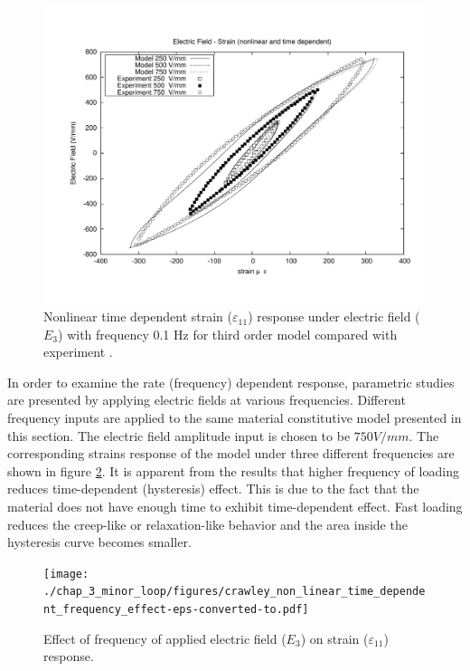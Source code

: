 \begin{figure}
\centering
\includegraphics[width=5.0in]
{./chap_3_minor_loop/figures/crawley_non_linear_time_independent_third_order.pdf}
\caption{Nonlinear time dependent strain ($\varepsilon_{11}$) response under electric field ($E_3$) with frequency 0.1 Hz for third order model compared with experiment \cite{Crawley1990}.}
\label{fig:TimeDepenNonLinCrawleyThirdordermodel}
\end{figure}
 
In order to examine the rate (frequency) dependent response, parametric studies are presented by applying electric fields at various frequencies. 
Different frequency inputs are applied to the same material constitutive model presented in this section. The electric field amplitude input is chosen to be $750 V/mm$.
The corresponding strains response of the model under three different frequencies are shown in figure \ref{fig:Frequency_Effect}. 
It is apparent from the results that higher frequency of loading reduces time-dependent (hysteresis) effect. 
This is due to the fact that the material does not have enough time to exhibit time-dependent effect. 
Fast loading reduces the creep-like or relaxation-like behavior and the area inside the hysteresis curve becomes smaller.  

\begin{figure}
\centering
\texttt{[image: ./chap\_3\_minor\_loop/figures/crawley\_non\_linear\_time\_dependent\_frequency\_effect-eps-converted-to.pdf]}
\caption{Effect of frequency of applied electric field ($E_3$) on strain ($\varepsilon_{11}$) response.}
\label{fig:Frequency_Effect}
\end{figure}


